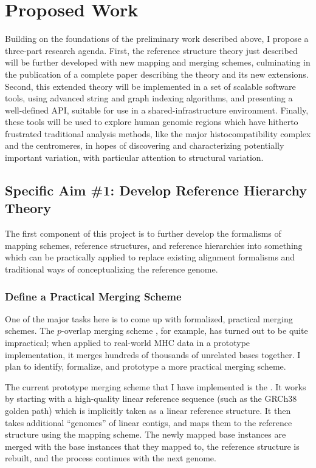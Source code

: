 \documentclass[11pt,proposal]{ucthesis}
\begin{document}
\chapter{Proposed Work}

Building on the foundations of the preliminary work described above, I propose a three-part research agenda. First, the reference structure theory just described will be further developed with new mapping and merging schemes, culminating in the publication of a complete paper describing the theory and its new extensions. Second, this extended theory will be implemented in a set of scalable software tools, using advanced string and graph indexing algorithms, and presenting a well-defined API, suitable for use in a shared-infrastructure environment. Finally, these tools will be used to explore human genomic regions which have hitherto frustrated traditional analysis methods, like the major histocompatibility complex and the centromeres, in hopes of discovering and characterizing potentially important variation, with particular attention to structural variation.

\section{Specific Aim \#1: Develop Reference Hierarchy Theory}

The first component of this project is to further develop the formalisms of mapping schemes, reference structures, and reference hierarchies into something which can be practically applied to replace existing alignment formalisms and traditional ways of conceptualizing the reference genome.

\subsection{Define a Practical Merging Scheme}
\label{subsec:aim1merging}

One of the major tasks here is to come up with formalized, practical merging schemes. The $p$-overlap merging scheme \cite{paten2014mapping}, for example, has turned out to be quite impractical; when applied to real-world MHC data in a prototype implementation, it merges hundreds of thousands of unrelated bases together. I plan to identify, formalize, and prototype a more practical merging scheme.

The current prototype merging scheme that I have implemented is the . It works by starting with a high-quality linear reference sequence (such as the GRCh38 golden path) which is implicitly taken as a linear reference structure. It then takes additional ``genomes'' of linear contigs, and maps them to the reference structure using the mapping scheme. The newly mapped base instances are merged with the base instances that they mapped to, the reference structure is rebuilt, and the process continues with the next genome. 
\end{document}
